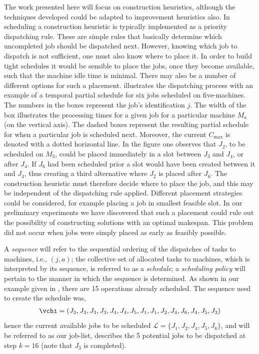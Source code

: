 \documentclass[]{article}
\begin{document}
The work presented here will focus on construction heuristics, although the 
techniques developed could be adapted to improvement heuristics also.  In 
scheduling a construction heuristic is typically implemented as a priority 
dispatching rule.  These are simple rules that basically determine which 
uncompleted job should be dispatched next.  However, knowing which job to 
dispatch is not sufficient, one must also know where to place it.  In order to 
build tight schedules it would be sensible to place the jobs, once they become 
available, such that the machine idle time is minimal. There may also be a 
number of different options for such a placement.
 illustrates the dispatching process with an example of 
a temporal partial schedule for six jobs scheduled on five-machines.  The 
numbers in the boxes represent the job's identification $j$.  The width of the 
box illustrates the processing times for a given job for a particular machine 
$M_a$ (on the vertical axis).  The dashed boxes represent the resulting partial 
schedule for when a particular job is scheduled next.  Moreover, the current
$C_{\max}$ is denoted with a dotted horizontal line.  In the figure one observes
that $J_2$, to be scheduled on $M_3$, could be placed immediately in a slot 
between $J_3$ and $J_4$, or after $J_4$.  If $J_6$ had been scheduled prior a 
slot would have been created between it and $J_4$, thus creating a third 
alternative where $J_2$ is placed after $J_6$.  The construction heuristic must 
therefore decide where to place the job, and this may be independent of the 
dispatching rule applied.  Different placement strategies could be considered, 
for example placing a job in smallest feasible slot.  In our preliminary
experiments we have discovered that such a placement could rule out the 
possibility of constructing solutions with an optimal makespan. This problem 
did not occur when jobs were simply placed as early as feasibly possible.

A \emph{sequence} will refer to the sequential ordering of the dispatches of 
tasks to machines, i.e., $(j,a)$; the collective set of allocated tasks to 
machines, which is interpreted by its sequence, is referred to as a 
\emph{schedule}; a \emph{scheduling policy} will pertain to the manner in which 
the sequence is determined.  As shown in our example given in 
, there are 15 operations already scheduled. The 
sequence used to create the schedule was,
\begin{eqnarray}
\vchi=\left(J_3,J_3,J_3,J_3,J_4,J_4,J_5,J_1,J_1,J_2,J_4,J_6,J_4,J_5,J_3\right)
\end{eqnarray}
hence the current available jobs to be scheduled 
$\mathcal{L}=\{J_1,J_2,J_4,J_5,J_6\}$, and will be referred to as our job-list, 
describes the 5 potential jobs to be dispatched at step $k=16$ (note that $J_3$ 
is completed).













\section{}
\lipsum[1-7]


  
\end{document}
